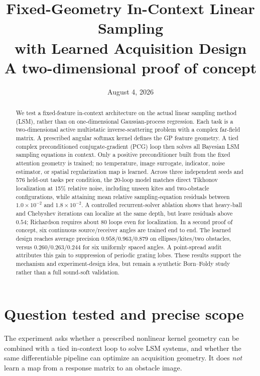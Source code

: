 \documentclass[10pt]{article}
\title{\vspace{-1.4em}\textbf{Fixed-Geometry In-Context Linear Sampling\\with Learned Acquisition Design}\\[-0.15em]
\large A two-dimensional proof of concept}
\author{}
\date{August 4, 2026}
\begin{document}
\maketitle
\vspace{-2.0em}

\begin{abstract}
We test a fixed-feature in-context architecture on the actual linear sampling
method (LSM), rather than on one-dimensional Gaussian-process regression.  Each
task is a two-dimensional active multistatic inverse-scattering problem with a
complex far-field matrix.  A prescribed angular softmax kernel defines the GP
feature geometry.  A tied complex preconditioned conjugate-gradient (PCG) loop
then solves all Bayesian LSM sampling equations in context.  Only a positive
preconditioner built from the fixed attention geometry is trained; no
temperature, image surrogate, indicator, noise estimator, or spatial
regularization map is learned.  Across three independent seeds and 576 held-out
tasks per condition, the 20-loop model matches direct Tikhonov localization at
15\% relative noise, including unseen kites and two-obstacle configurations,
while attaining mean relative sampling-equation residuals between $1.0\times
10^{-2}$ and $1.8\times10^{-2}$.  A controlled recurrent-solver ablation shows
that heavy-ball and Chebyshev iterations can localize at the same depth, but
leave residuals above $0.54$; Richardson requires about 80 loops even for
localization.  In a second proof of concept, six continuous
source/receiver angles are trained end to end.  The learned design reaches
average precision $0.958/0.963/0.879$ on ellipses/kites/two obstacles, versus
$0.260/0.263/0.244$ for six uniformly spaced angles.  A point-spread audit
attributes this gain to suppression of periodic grating lobes.  These results
support the mechanism and experiment-design idea, but remain a synthetic
Born--Foldy study rather than a full sound-soft validation.
\end{abstract}

\section{Question tested and precise scope}

The experiment asks whether a prescribed nonlinear kernel geometry can be
combined with a tied in-context loop to solve LSM systems, and whether the same
differentiable pipeline can optimize an acquisition geometry.  It does
\emph{not} learn a map from a response matrix to an obstacle image.
\end{document}
